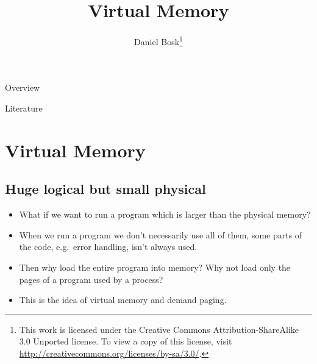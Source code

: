 \documentclass{beamer}
\title{%
  Virtual Memory
}
\author{Daniel Bosk\footnote{%
	\tiny
  This work is licensed under the Creative Commons Attribution-ShareAlike 3.0 
  Unported license.
	To view a copy of this license, visit 
	\url{http://creativecommons.org/licenses/by-sa/3.0/}.
}}
\institute[MIUN ICS]{%
  Department of Information and Communication Systems (ICS),\\
  Mid Sweden University, Sundsvall.
}
\date{\svnId}
\begin{document}
\begin{frame}
  \titlepage
\end{frame}

\begin{frame}{Overview}
	\tableofcontents
\end{frame}

\begin{frame}{Literature}
  
\end{frame}





\section{Virtual Memory}

\subsection{Huge logical but small physical}

\begin{frame}{\insertsubsectionhead}
  \begin{itemize}
    \item What if we want to run a program which is larger than the physical 
      memory?

    \item When we run a program we don't necessarily use all of them, some 
      parts of the code, e.g.\ error handling, isn't always used.

    \item Then why load the entire program into memory?
      Why not load only the pages of a program used by a process?

    \item This is the idea of virtual memory and demand paging.

  \end{itemize}
\end{frame}
\end{document}
